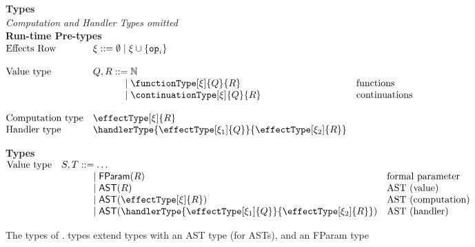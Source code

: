 \begin{figure}[t]
  \begin{core-desc}
    {\large {\textbf{Types}}}\\
    \textit{Computation and Handler Types omitted}\\

    \textbf{Run-time Pre-types}\\
    $\begin{array}{@{}lllr}
    \text{Effects Row} & \xi ::= \emptyset \mid \xi \cup \{ \texttt{op}_i \} \\
    \\
    \text{Value type} & Q,R ::= \mathbb{N} & \\
                              &\quad\quad\quad\,\, \mid \functionType[\xi]{Q}{R} & \text{functions}\\
                              &\quad\quad\quad\,\, \mid \continuationType[\xi]{Q}{R} & \text{continuations}\\ \\
    \text{Computation type} & \effectType[\xi]{R} \\
    \text{Handler type} & \handlerType{\effectType[\xi_1]{Q}}{\effectType[\xi_2]{R}}
    \end{array}$
    
    \vspace{4mm}

    \textbf{Types}\\
  $\begin{array}{@{}lllr}
    \text{Value type} & S, T ::= \ldots\\
                              &\quad\quad\quad\,\, \mid \textsf{FParam}(R) & \text{formal parameter}\\
                              &\quad\quad\quad\,\, \mid \textsf{AST}(R) & \text{AST (value)}\\
                              &\quad\quad\quad\,\, \mid \textsf{AST}(\effectType[\xi]{R}) & \text{AST (computation)}\\
                              &\quad\quad\quad\,\, \mid \textsf{AST}(\handlerType{\effectType[\xi_1]{Q}}{\effectType[\xi_2]{R}}) & \text{AST (handler)}\\
  \end{array}$
  \end{core-desc}
  \caption{The types of \coreLang{}. \coreLang{} types extend \efflang{} types with an \textsf{AST} type (for ASTs), and an \textsf{FParam} type}%
  \label{fig:core-types}
\end{figure}

